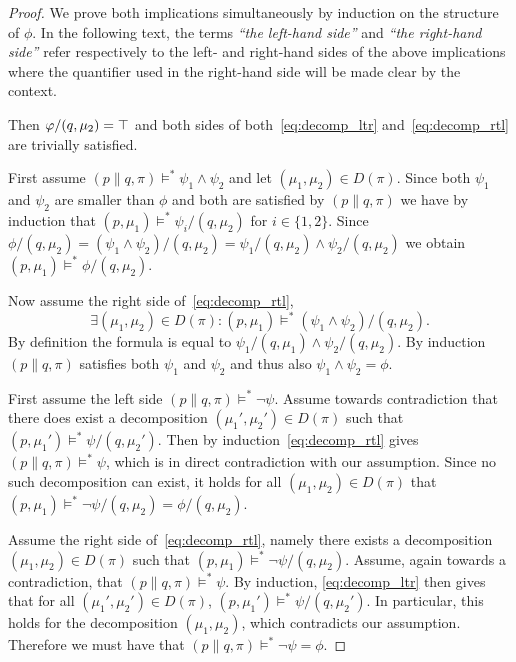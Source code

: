 \begin{proof}
    We prove both implications simultaneously by induction on the structure of $\phi$. 
    In the following text, the terms
    {\em ``the left-hand side''} and {\em ``the right-hand side''} refer respectively
    to the left- and right-hand sides of the above implications where the quantifier
    used in the right-hand side will be made clear by the context.

     Then $\varphi/(q, \mu_2) = \top$ and both sides
    of both~\eqref{eq:decomp_ltr} and~\eqref{eq:decomp_rtl} are trivially satisfied.


    \par\nobreak
    \ltr First assume $(p\parallel q, \pi)
    \vDash^* \psi_1 \land \psi_2$
    and let $(\mu_1,\mu_2)\in D(\pi)$.
    Since both $\psi_1$ and $\psi_2$ are smaller than $\phi$ and both are satisfied by
    $(p\parallel q, \pi)$ we have by induction that $(p,\mu_1) \vDash^* \psi_i/(q, \mu_2)$
    for $i\in\{1,2\}$. Since $\phi/(q,\mu_2) = (\psi_1 \land \psi_2)/(q,\mu_2) =
    \psi_1 / (q, \mu_2) \land \psi_2 / (q,\mu_2)$ we obtain $(p,\mu_1) \vDash^*
    \phi/(q,\mu_2)$.

    \rtl Now assume the right side of~\eqref{eq:decomp_rtl}, 
    \[
        \exists (\mu_1,\mu_2)\in D(\pi) : (p,\mu_1)
        \vDash^* (\psi_1 \land \psi_2)/(q, \mu_2).
    \] 
    By definition the formula is equal
    to $\psi_1/(q,\mu_1) \land \psi_2/(q,\mu_2)$. By induction \mbox{$(p\parallel q, \pi)$}
    satisfies both $\psi_1$ and $\psi_2$ and thus also $\psi_1 \land \psi_2 = \phi$.


    \par\nobreak
    \ltr First assume the left side $(p\parallel q, \pi) \vDash^* \neg\psi$.
    Assume towards
    contradiction that there does exist a decomposition $(\mu_1',\mu_2')\in D(\pi)$
    such that $(p, \mu_1') \vDash^* \psi/(q, \mu_2')$. 
    Then by induction~\eqref{eq:decomp_rtl} gives $(p\parallel q, \pi) \vDash^* \psi$,
    which is in direct contradiction with our assumption. Since no such decomposition
    can exist, it holds for all $(\mu_1,\mu_2)\in D(\pi)$ that
    $(p,\mu_1) \vDash^* \neg\psi/(q,\mu_2) = \phi/(q,\mu_2)$.

    \rtl Assume the right side of~\eqref{eq:decomp_rtl}, namely there exists a
    decomposition $(\mu_1,\mu_2)\in D(\pi)$ such that $(p,\mu_1)\vDash^* \neg\psi/(q,\mu_2)$.
    Assume, again towards a contradiction, that $(p\parallel q,\pi)\vDash^*\psi$.
    By induction, \eqref{eq:decomp_ltr} then gives that for all $(\mu_1',\mu_2')\in D(\pi)$,
    $(p,\mu_1')\vDash^* \psi/(q,\mu_2')$. In particular, this holds for the
    decomposition $(\mu_1,\mu_2)$, which contradicts our assumption. Therefore
    we must have that $(p\parallel q,\pi) \vDash^* \neg\psi = \phi$.



\end{proof}
